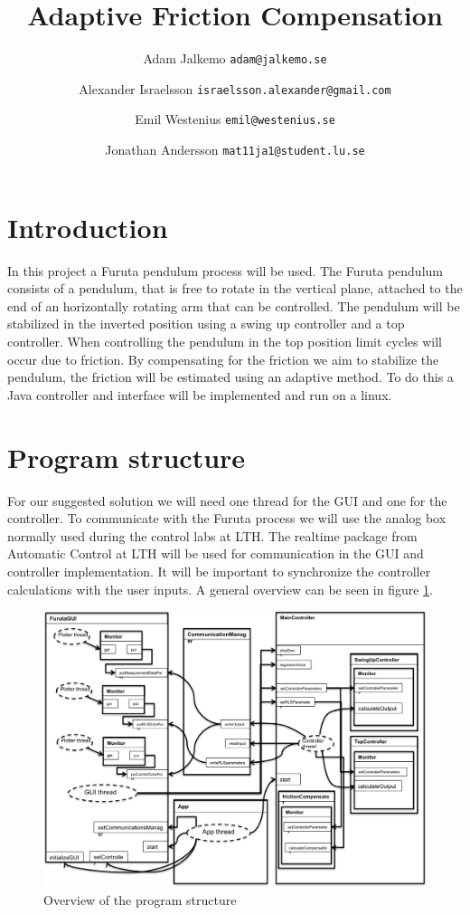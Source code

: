 \documentclass[10pt,a4paper]{article}
\author{Adam Jalkemo \texttt{adam@jalkemo.se} \and
Alexander Israelsson \texttt{israelsson.alexander@gmail.com} \and
Emil Westenius \texttt{emil@westenius.se} \and
Jonathan Andersson \texttt{mat11ja1@student.lu.se}}
\title{Adaptive Friction Compensation}
\begin{document}
\maketitle

\section{Introduction}
In this project a Furuta pendulum process will be used. The Furuta pendulum consists of a pendulum, that is free to rotate in the vertical plane, attached to the end of an horizontally rotating arm that can be controlled. The pendulum will be stabilized in the inverted position using a swing up controller and a top controller. When controlling the pendulum in the top position limit cycles will occur due to friction. By compensating for the friction we aim to stabilize the pendulum, the friction will be estimated using an adaptive method. To do this a Java controller and interface will be implemented and run on a linux.
\section{Program structure}
For our suggested solution we will need one thread for the GUI and one for the controller. To communicate with the Furuta process we will use the analog box normally used during the control labs at LTH. The realtime package from Automatic Control at LTH will be used for communication in the GUI and controller implementation. It will be important to synchronize the controller calculations with the user inputs. A general overview can be seen in figure \ref{fig:uml}.
\begin{figure}[H]
\centerline{\includegraphics[scale=0.7]{notUML.png}}
\caption{Overview of the program structure}
\label{fig:uml}
\end{figure}
\end{document}
